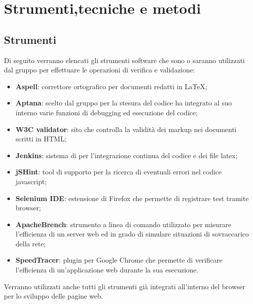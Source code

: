 \section{Strumenti,tecniche e metodi}{
\subsection{Strumenti}{
	\label{sec:strumenti}
	Di seguito verranno elencati gli strumenti software che sono o saranno utilizzati dal gruppo per effettuare le operazioni di verifica e validazione:
	\begin{itemize}
		\item \textbf{Aspell}: correttore ortografico per documenti redatti in \LaTeX;
		\item \textbf{Aptana}: scelto dal gruppo per la stesura del codice ha integrato al suo interno varie funzioni di debugging ed esecuzione del codice;
		\item \textbf{W3C validator}: sito che controlla la validità dei markup nei documenti scritti in HTML;
		\item \textbf{Jenkins}: sistema di per l'integrazione continua del codice e dei file latex;
		\item \textbf{jSHint}: tool di supporto per la ricerca di eventuali errori nel codice javascript;
		\item \textbf{Selenium IDE}: estensione di Firefox che permette di registrare test tramite browser;
		\item \textbf{ApacheBrench}: strumento a linea di comando utilizzato per misurare l’efficienza di un server\ped{g} web ed in grado di simulare situazioni di sovraccarico della rete;
		\item \textbf{SpeedTracer}: plugin per Google Chrome che permette di verificare l’efficienza di un’applicazione web durante la sua esecuzione.
	\end{itemize}
	Verranno utilizzati anche tutti gli strumenti già integrati all'interno del browser per lo sviluppo delle pagine web.
	}
}
